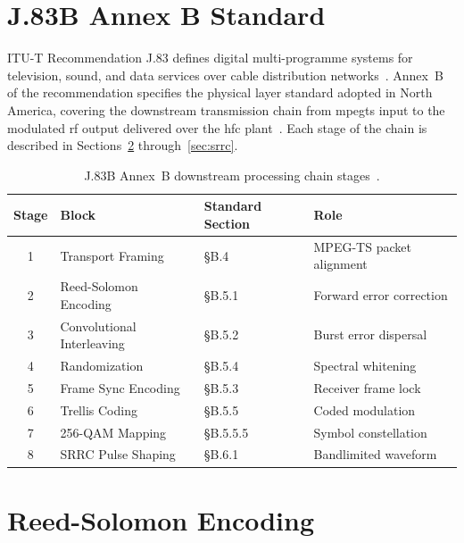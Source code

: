 
\section{J.83B Annex B Standard}
\label{sec:j83b_standard}

ITU-T Recommendation J.83 defines digital multi-programme systems
for television, sound, and data services over cable distribution
networks~\cite{ITU_J83}.
Annex~B of the recommendation specifies the physical layer standard
adopted in North America, covering the downstream transmission chain
from \ac{mpegts} input to the modulated \ac{rf} output delivered
over the \ac{hfc} plant~\cite{ITU_J83,SCTE07}.
Each stage of the chain is described in
Sections~\ref{sec:rs_encoding} through~\ref{sec:srrc}.

\begin{table}[htbp]
  \caption{J.83B Annex~B downstream processing chain stages~\cite{ITU_J83}.}
  \label{tab:j83b_chain_stages}
  \centering
  \begin{tabular}{clll}
    \hline
    Stage & Block & Standard Section & Role \\
    \hline
    1 & Transport Framing         & \S B.4     & MPEG-TS packet alignment \\
    2 & Reed-Solomon Encoding     & \S B.5.1   & Forward error correction \\
    3 & Convolutional Interleaving & \S B.5.2  & Burst error dispersal \\
    4 & Randomization             & \S B.5.4   & Spectral whitening \\
    5 & Frame Sync Encoding       & \S B.5.3   & Receiver frame lock \\
    6 & Trellis Coding            & \S B.5.5   & Coded modulation \\
    7 & 256-QAM Mapping           & \S B.5.5.5 & Symbol constellation \\
    8 & SRRC Pulse Shaping        & \S B.6.1   & Bandlimited waveform \\
    \hline
  \end{tabular}
\end{table}

\section{Reed-Solomon Encoding}
\label{sec:rs_encoding}

